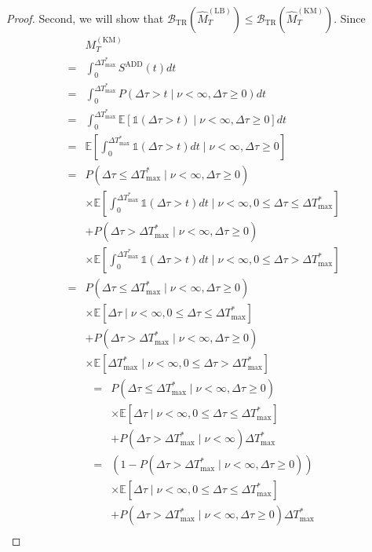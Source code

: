 \documentclass[10pt,a4paper]{amsart}
\def\mbe{\mathbb{E}}
\def\mbone{\mathds{1}}
\def\nn{\nonumber \\ }
\begin{document}
\begin{proof}
    Second, we will show that $\mathcal{B}_\mathrm{TR}(\hat{M}_T^\mathrm{(LB)}) \leq \mathcal{B}_\mathrm{TR}(\hat{M}_T^\mathrm{(KM)})$.
    Since
    \begin{align}
        &M_T^\mathrm{(KM)} \nn 
        =& \int_0^{\Delta T_\mathrm{max}^*} S^\mathrm{ADD}(t) dt \\
        =&  \int_0^{\Delta T_\mathrm{max}^*}  P(\Delta \tau > t \mid \nu < \infty, \Delta \tau \geq 0) dt\\
        =&  \int_0^{\Delta T_\mathrm{max}^*} \mbe[\mbone(\Delta \tau > t) \mid \nu < \infty, \Delta \tau \geq 0] dt\\
        =&  \mbe [\int_0^{\Delta T_\mathrm{max}^*} \mbone(\Delta \tau > t) dt \mid \nu < \infty, \Delta \tau \geq 0] \\
        =&  P(\Delta \tau \leq \Delta T_\mathrm{max}^* \mid \nu < \infty, \Delta \tau \geq 0) \nn
            &\times \mbe[ \int_0^{\Delta T_\mathrm{max}^*} \mbone(\Delta \tau > t)  dt \mid \nu < \infty,  0 \leq \Delta \tau \leq \Delta T_\mathrm{max}^* ] \nn
            &+  P(\Delta \tau > \Delta T_\mathrm{max}^* \mid \nu < \infty, \Delta \tau \geq 0) \nn
            &\times \mbe[ \int_0^{\Delta T_\mathrm{max}^*} \mbone(\Delta \tau > t)  dt \mid \nu < \infty,  0 \leq \Delta \tau > \Delta T_\mathrm{max}^*] \\
        =&  P(\Delta \tau \leq \Delta T_\mathrm{max}^* \mid \nu < \infty , \Delta \tau \geq 0) \nn
            &\times \mbe[ \Delta \tau \mid \nu < \infty, 0 \leq  \Delta \tau \leq \Delta T_\mathrm{max}^*] \nn
            &+  P(\Delta \tau > \Delta T_\mathrm{max}^* \mid \nu < \infty, \Delta \tau \geq 0 ) \nn
            &\times \mbe[ \Delta T_\mathrm{max}^*  \mid \nu < \infty, 0 \leq \Delta \tau > \Delta T_\mathrm{max}^*] 
    \end{align}
    \begin{align}
        =& P(\Delta \tau \leq \Delta T_\mathrm{max}^* \mid \nu < \infty, \Delta \tau \geq 0) \nn 
            &\times \mbe[ \Delta \tau \mid \nu < \infty, 0 \leq \Delta \tau \leq \Delta T_\mathrm{max}^*] \nn
            &+  P(\Delta \tau > \Delta T_\mathrm{max}^* \mid \nu < \infty) 
            \Delta T_\mathrm{max}^*  \\
        =& (1 - P(\Delta \tau > \Delta T_\mathrm{max}^* \mid \nu < \infty, \Delta \tau \geq 0)) \nn 
            &\times \mbe[ \Delta \tau \mid \nu < \infty, 0 \leq \Delta \tau \leq \Delta T_\mathrm{max}^*] \nn
            &+  P(\Delta \tau > \Delta T_\mathrm{max}^* \mid \nu < \infty, \Delta \tau \geq 0) 
            \Delta T_\mathrm{max}^* \\

\end{align}
\end{proof}
\end{document}

